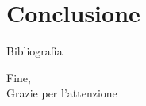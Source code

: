 \documentclass{beamer}
\begin{document}
\section{Conclusione}

\begin{frame}{Bibliografia}
	\fontsize{8pt}{7.2}\selectfont
	
	
\end{frame}

\begin{frame}{}
	Fine,\\
	Grazie per l'attenzione
\end{frame}
\end{document}

